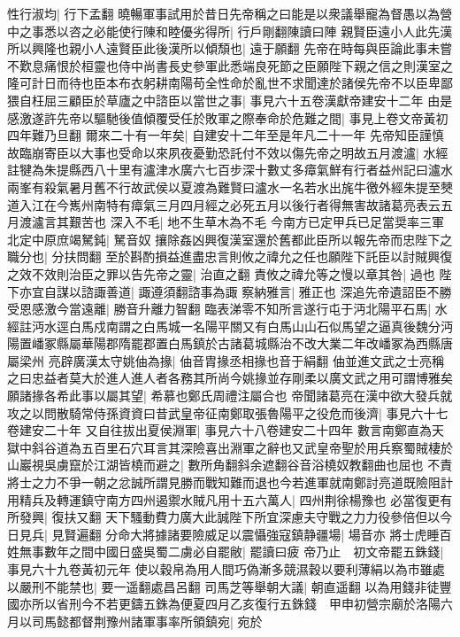 性行淑均|{
	行下孟翻}
曉暢軍事試用於昔日先帝稱之曰能是以衆議舉寵為督愚以為營中之事悉以咨之必能使行陳和睦優劣得所|{
	行戶剛翻陳讀曰陣}
親賢臣遠小人此先漢所以興隆也親小人遠賢臣此後漢所以傾頹也|{
	遠于願翻}
先帝在時每與臣論此事未嘗不歎息痛恨於桓靈也侍中尚書長史參軍此悉端良死節之臣願陛下親之信之則漢室之隆可計日而待也臣本布衣躬耕南陽苟全性命於亂世不求聞達於諸侯先帝不以臣卑鄙猥自枉屈三顧臣於草廬之中諮臣以當世之事|{
	事見六十五卷漢獻帝建安十二年}
由是感激遂許先帝以驅馳後值傾覆受任於敗軍之際奉命於危難之間|{
	事見上卷文帝黃初四年難乃旦翻}
爾來二十有一年矣|{
	自建安十二年至是年凡二十一年}
先帝知臣謹慎故臨崩寄臣以大事也受命以來夙夜憂勤恐託付不效以傷先帝之明故五月渡瀘|{
	水經註犍為朱提縣西八十里有瀘津水廣六七百步深十數丈多瘴氣鮮有行者益州記曰瀘水兩峯有殺氣暑月舊不行故武侯以夏渡為難賢曰瀘水一名若水出旄牛徼外經朱提至僰道入江在今嶲州南特有瘴氣三月四月經之必死五月以後行者得無害故諸葛亮表云五月渡瀘言其艱苦也}
深入不毛|{
	地不生草木為不毛}
今南方已定甲兵已足當奨率三軍北定中原庶竭駑鈍|{
	駑音奴}
攘除姦凶興復漢室還於舊都此臣所以報先帝而忠陛下之職分也|{
	分扶問翻}
至於斟酌損益進盡忠言則攸之禕允之任也願陛下託臣以討賊興復之效不效則治臣之罪以告先帝之靈|{
	治直之翻}
責攸之禕允等之慢以章其咎|{
	過也}
陛下亦宜自謀以諮諏善道|{
	諏遵須翻諮事為諏}
察納雅言|{
	雅正也}
深追先帝遺詔臣不勝受恩感激今當遠離|{
	勝音升離力智翻}
臨表涕零不知所言遂行屯于沔北陽平石馬|{
	水經註沔水逕白馬戍南謂之白馬城一名陽平關又有白馬山山石似馬望之逼真後魏分沔陽置嶓冢縣屬華陽郡隋罷郡置白馬鎮於古諸葛城縣治不改大業二年改嶓冢為西縣唐屬梁州}
亮辟廣漢太守姚伷為掾|{
	伷音胄掾丞相掾也音于絹翻}
伷並進文武之士亮稱之曰忠益者莫大於進人進人者各務其所尚今姚掾並存剛柔以廣文武之用可謂博雅矣願諸掾各希此事以屬其望|{
	希慕也鄭氏周禮注屬合也}
帝聞諸葛亮在漢中欲大發兵就攻之以問散騎常侍孫資資曰昔武皇帝征南鄭取張魯陽平之役危而後濟|{
	事見六十七卷建安二十年}
又自往拔出夏侯淵軍|{
	事見六十八卷建安二十四年}
數言南鄭直為天獄中斜谷道為五百里石穴耳言其深險喜出淵軍之辭也又武皇帝聖於用兵察蜀賊棲於山巖視吳虜竄於江湖皆橈而避之|{
	數所角翻斜余遮翻谷音浴橈奴教翻曲也屈也}
不責將士之力不爭一朝之忿誠所謂見勝而戰知難而退也今若進軍就南鄭討亮道既險阻計用精兵及轉運鎮守南方四州遏禦水賊凡用十五六萬人|{
	四州荆徐楊豫也}
必當復更有所發興|{
	復扶又翻}
天下騷動費力廣大此誠陛下所宜深慮夫守戰之力力役參倍但以今日見兵|{
	見賢遍翻}
分命大將據諸要險威足以震懾強寇鎮静疆場|{
	場音亦}
將士虎睡百姓無事數年之間中國日盛吳蜀二虜必自罷敝|{
	罷讀曰疲}
帝乃止　初文帝罷五銖錢|{
	事見六十九卷黃初元年}
使以穀帛為用人間巧偽漸多競濕穀以要利薄絹以為市雖處以嚴刑不能禁也|{
	要一遥翻處昌呂翻}
司馬芝等舉朝大議|{
	朝直遥翻}
以為用錢非徒豐國亦所以省刑今不若更鑄五銖為便夏四月乙亥復行五銖錢　甲申初營宗廟於洛陽六月以司馬懿都督荆豫州諸軍事率所領鎮宛|{
	宛於}


